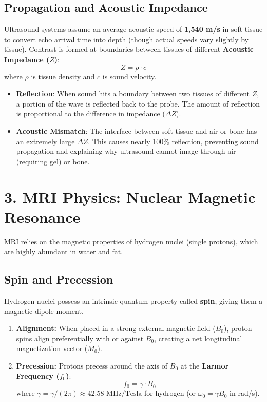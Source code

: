\subsection*{Propagation and Acoustic Impedance}
Ultrasound systems assume an average acoustic speed of \textbf{1,540 m/s} in soft tissue to convert echo arrival time into depth (though actual speeds vary slightly by tissue). Contrast is formed at boundaries between tissues of different \textbf{Acoustic Impedance ($Z$)}:
\[
Z = \rho \cdot c
\]
where $\rho$ is tissue density and $c$ is sound velocity.
\begin{itemize}
    \item \textbf{Reflection}: When sound hits a boundary between two tissues of different $Z$, a portion of the wave is reflected back to the probe. The amount of reflection is proportional to the difference in impedance ($\Delta Z$).
    \item \textbf{Acoustic Mismatch}: The interface between soft tissue and air or bone has an extremely large $\Delta Z$. This causes nearly 100\% reflection, preventing sound propagation and explaining why ultrasound cannot image through air (requiring gel) or bone.
\end{itemize}


\section*{3. MRI Physics: Nuclear Magnetic Resonance}
MRI relies on the magnetic properties of hydrogen nuclei (single protons), which are highly abundant in water and fat.

\subsection*{Spin and Precession}
Hydrogen nuclei possess an intrinsic quantum property called \textbf{spin}, giving them a magnetic dipole moment.
\begin{enumerate}
    \item \textbf{Alignment:} When placed in a strong external magnetic field ($B_0$), proton spins align preferentially with or against $B_0$, creating a net longitudinal magnetization vector ($M_0$).
    \item \textbf{Precession:} Protons precess around the axis of $B_0$ at the \textbf{Larmor Frequency ($f_0$)}:
    \[
    f_0 = \bar{\gamma} \cdot B_0
    \]
    where $\bar{\gamma} = \gamma/(2\pi) \approx 42.58\text{ MHz/Tesla}$ for hydrogen (or $\omega_0 = \gamma B_0$ in rad/s).
\end{enumerate}

